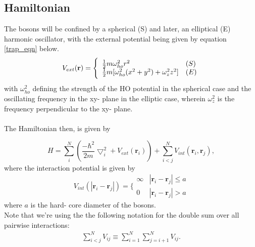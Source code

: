 \documentclass[11pt,a4paper,titlepage]{article}
\begin{document}
\subsection{Hamiltonian}
The bosons will be confined by a spherical (S) and later, an elliptical (E) harmonic oscillator, with the external potential being given by equation \eqref{trap_eqn} below.
\begin{equation}
 V_{ext}(\mathbf{r}) = 
 \Bigg\{
 \begin{array}{ll}
	 \frac{1}{2}m\omega_{ho}^2r^2 & (S)\\
 \strut
	 \frac{1}{2}m[\omega_{ho}^2(x^2+y^2) + \omega_z^2z^2] & (E)
 \end{array}\label{trap_eqn}
 \end{equation}
with $\omega_{ho}^2$ defining the strength of the HO potential in the spherical case and the oscillating frequency in the xy- plane in the elliptic case, wherein $\omega_{z}^2$ is the frequency perpendicular to the xy- plane.\\\\The Hamiltonian then, is given by 

\begin{equation}
     H = \sum_i^N \left(\frac{-\hbar^2}{2m}{\bigtriangledown }_{i}^2 +V_{ext}({\mathbf{r}}_i)\right)  +
	 \sum_{i<j}^{N} V_{int}({\mathbf{r}}_i,{\mathbf{r}}_j),
 \end{equation}
where the interaction potential is given by 
\begin{equation}
 V_{int}(|\mathbf{r}_i-\mathbf{r}_j|) =  \Bigg\{
 \begin{array}{ll}
	 \infty & {|\mathbf{r}_i-\mathbf{r}_j|} \leq {a}\\
	 0 & {|\mathbf{r}_i-\mathbf{r}_j|} > {a}
 \end{array}
\end{equation}
where $a$ is the hard- core diameter of the bosons.\\Note that we're using the the following notation for the double sum over all pairwise interactions:
\begin{align}
    \sum_{i < j}^{N} V_{ij} \equiv \sum_{i = 1}^{N}\sum_{j = i + 1}^{N} V_{ij}.
\end{align}
\end{document}
